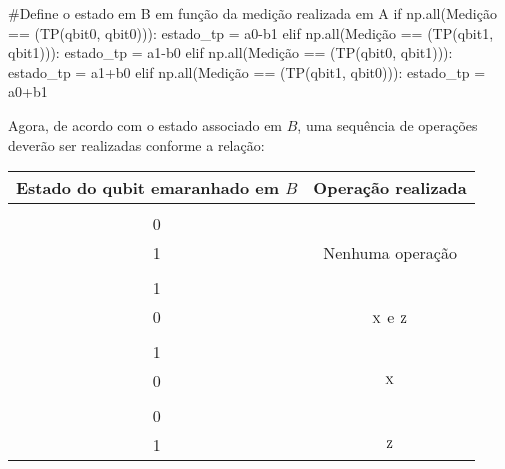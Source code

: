 \begin{pycode}
    #Define o estado em B em função da medição realizada em A
    if np.all(Medição == (TP(qbit0, qbit0))):
        estado_tp = a0-b1
    elif np.all(Medição == (TP(qbit1, qbit1))):
        estado_tp = a1-b0
    elif np.all(Medição == (TP(qbit0, qbit1))):
        estado_tp = a1+b0
    elif np.all(Medição == (TP(qbit1, qbit0))):
        estado_tp = a0+b1
\end{pycode}

Agora, de acordo com o estado associado em \(B\), uma sequência de operações deverão ser realizadas conforme a relação:
\begin{center}
  \begin{tabular}{cc}
    \toprule
    Estado do qubit emaranhado em \(B\) & Operação realizada \\
    \midrule
    \(\alpha \begin{bmatrix} 1 \\ 0 \end{bmatrix} + \beta \begin{bmatrix} 0 \\ 1 \end{bmatrix}\) & Nenhuma operação \\
    \(\alpha \begin{bmatrix} 0 \\ 1 \end{bmatrix} - \beta \begin{bmatrix} 1 \\ 0 \end{bmatrix}\) & \(\operatorname{\textsc{x}}\) e \(\operatorname{\textsc{z}}\) \\
    \(\alpha \begin{bmatrix} 0 \\ 1 \end{bmatrix} + \beta \begin{bmatrix} 1 \\ 0 \end{bmatrix}\) & \(\operatorname{\textsc{x}}\) \\
    \(\alpha \begin{bmatrix} 1 \\ 0 \end{bmatrix} - \beta \begin{bmatrix} 0 \\ 1 \end{bmatrix}\) & \(\operatorname{\textsc{z}}\) \\
    \bottomrule
  \end{tabular}
\end{center}

